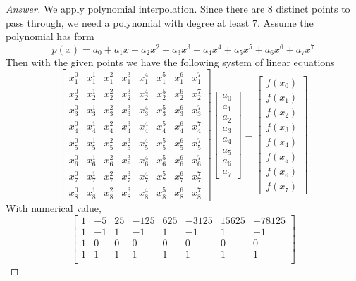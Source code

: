 \begin{proof}[Answer]
We apply polynomial interpolation.
Since there are 8 distinct points to pass through, we need a polynomial with degree at least 7.
Assume the polynomial has form
\[ p(x)=a_0 + a_1 x + a_2 x^2 + a_3 x^3 + a_4 x^4 + a_5 x^5 + a_6 x^6 + a_7 x^7 \]
Then with the given points we have the following system of linear equations
\[\begin{bmatrix}
x_1^0 & x_1^1 & x_1^2 & x_1^3 & x_1^4 & x_1^5 & x_1^6 & x_1^7 \\
x_2^0 & x_2^1 & x_2^2 & x_2^3 & x_2^4 & x_2^5 & x_2^6 & x_2^7 \\
x_3^0 & x_3^1 & x_3^2 & x_3^3 & x_3^4 & x_3^5 & x_3^6 & x_3^7 \\
x_4^0 & x_4^1 & x_4^2 & x_4^3 & x_4^4 & x_4^5 & x_4^6 & x_4^7 \\
x_5^0 & x_5^1 & x_5^2 & x_5^3 & x_5^4 & x_5^5 & x_5^6 & x_5^7 \\
x_6^0 & x_6^1 & x_6^2 & x_6^3 & x_6^4 & x_6^5 & x_6^6 & x_6^7 \\
x_7^0 & x_7^1 & x_7^2 & x_7^3 & x_7^4 & x_7^5 & x_7^6 & x_7^7 \\
x_8^0 & x_8^1 & x_8^2 & x_8^3 & x_8^4 & x_8^5 & x_8^6 & x_8^7
\end{bmatrix}
\begin{bmatrix}
a_0 \\ a_1 \\ a_2 \\ a_3 \\ a_4 \\ a_5 \\ a_6 \\ a_7
\end{bmatrix}=
\begin{bmatrix}
f(x_0) \\ f(x_1) \\ f(x_2) \\ f(x_3) \\ f(x_4) \\ f(x_5) \\ f(x_6) \\ f(x_7)
\end{bmatrix}\]
With numerical value,
\[\begin{bmatrix}
1 &	-5	&	25	&	-125	&	625		&	-3125	&	15625	&	-78125	\\
1 &	-1	&	1	&	-1		&	1		&	-1		&	1		&	-1		\\
1 &	0	&	0	&	0		&	0		&	0		&	0		&	0		\\
1 &	1	&	1	&	1		&	1		&	1		&	1		&	1		\\

\end{bmatrix}\]
\end{proof}
